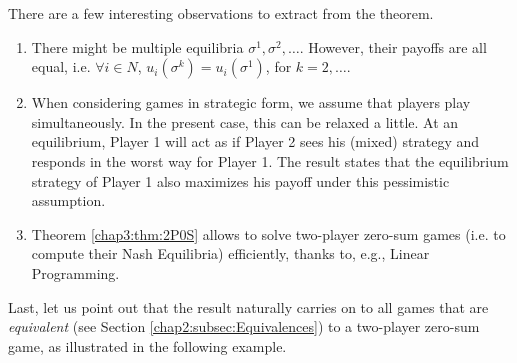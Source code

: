There are a few interesting observations to extract from the theorem.
\begin{enumerate}
\item There might be multiple equilibria $\sigma^1, \sigma^2, \ldots$. However, their payoffs are all equal, i.e. $\forall i \in N$, $u_i(\sigma^k) = u_i(\sigma^1)$, for $k = 2, \ldots$.
\item When considering games in strategic form, we assume that players play simultaneously. In the present case, this can be relaxed a little. At an equilibrium, Player 1 will act as if Player 2 sees his (mixed) strategy and responds in the worst way for Player 1. The result states that the equilibrium strategy of Player 1 also maximizes his payoff under this pessimistic assumption.
\item Theorem \ref{chap3:thm:2P0S} allows to solve two-player zero-sum games (i.e. to compute their Nash Equilibria) efficiently, thanks to, e.g., Linear Programming.
\end{enumerate}
\label{chap:NE}

Last, let us point out that the result naturally
carries on to all games that are \emph{equivalent} (see Section \ref{chap2:subsec:Equivalences}) to a two-player zero-sum game, as illustrated in the following example.


